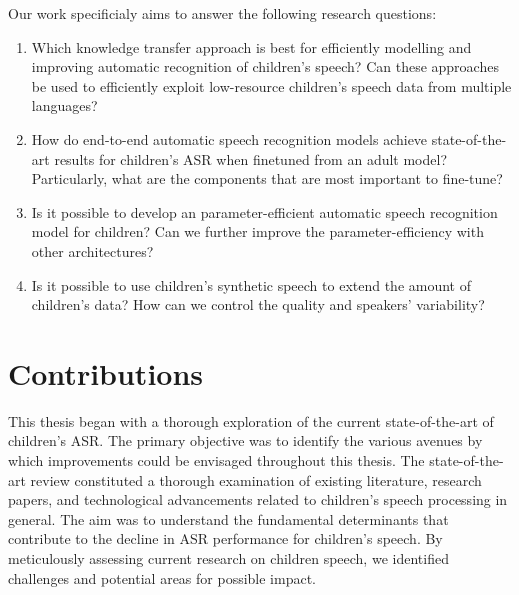 Our work specificialy aims to answer the following research questions:
\begin{enumerate} 
\item Which knowledge transfer approach is best for efficiently modelling and improving automatic recognition of children's speech? Can these approaches be used to efficiently exploit low-resource children's speech data from multiple languages?
\item  How do end-to-end automatic speech recognition models achieve state-of-the-art results for children's ASR when finetuned from an adult model? Particularly, what are the components that are most important to fine-tune?
\item Is it possible to develop an parameter-efficient automatic speech recognition model for children? Can we further improve the parameter-efficiency with other architectures? 
\item Is it possible to use children's synthetic speech to extend the amount of children's data? How can we control the quality and speakers’ variability?
\end{enumerate}

\section{Contributions}
This thesis began with a thorough exploration of the current state-of-the-art of children's ASR. The primary objective was to identify the various avenues by which improvements could be envisaged throughout this thesis. The state-of-the-art review constituted a thorough examination of existing literature, research papers, and technological advancements related to children's speech processing in general. The aim was to understand the fundamental determinants that contribute to the decline in ASR performance for children's speech. By meticulously assessing current research on children speech, we identified challenges and potential areas for possible impact.

